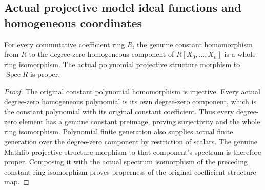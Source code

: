 \subsection{Actual projective model ideal functions and homogeneous coordinates}
\label{subsec:native-projective-model-ideals}

\begin{theorem}
\label{projective:native-polynomial-structure-proper}
\leanok
{}
For every commutative coefficient ring $R$, the genuine constant
homomorphism from $R$ to the degree-zero homogeneous component of
$R[X_0,\ldots,X_n]$ is a whole ring isomorphism. The actual polynomial
projective structure morphism to $\operatorname{Spec}R$ is proper.
\end{theorem}
\begin{proof}
The original constant polynomial homomorphism is injective. Every actual
degree-zero homogeneous polynomial is its own degree-zero component,
which is the constant polynomial with its original constant coefficient.
Thus every degree-zero element has a genuine constant preimage, proving
surjectivity and the whole ring isomorphism. Polynomial finite generation
also supplies actual finite generation over the degree-zero component
by restriction of scalars. The genuine Mathlib projective structure
morphism to that component's spectrum is therefore proper. Composing
it with the actual spectrum isomorphism of the preceding constant ring
isomorphism proves properness of the original coefficient structure map.
\end{proof}

